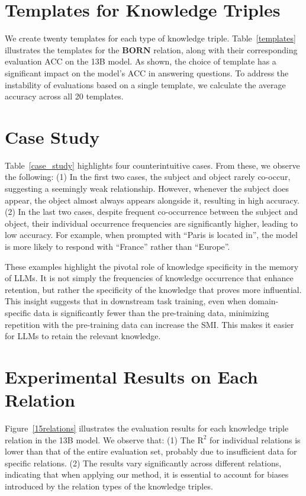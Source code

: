 
\section{Templates for Knowledge Triples}

We create twenty templates for each type of knowledge triple. Table~\ref{templates} illustrates the templates for the \(\mathbf{BORN}\) relation, along with their corresponding evaluation ACC on the 13B model. As shown, the choice of template has a significant impact on the model’s ACC in answering questions. To address the instability of evaluations based on a single template, we calculate the average accuracy across all 20 templates.



\section{Case Study}

Table~\ref{case_study} highlights four counterintuitive cases. From these, we observe the following: (1) In the first two cases, the subject and object rarely co-occur, suggesting a seemingly weak relationship. However, whenever the subject does appear, the object almost always appears alongside it, resulting in high accuracy. (2) In the last two cases, despite frequent co-occurrence between the subject and object, their individual occurrence frequencies are significantly higher, leading to low accuracy. For example, when prompted with ``Paris is located in'', the model is more likely to respond with ``France'' rather than ``Europe''.

These examples highlight the pivotal role of knowledge specificity in the memory of LLMs. It is not simply the frequencies of knowledge occurrence that enhance retention, but rather the specificity of the knowledge that proves more influential. This insight suggests that in downstream task training, even when domain-specific data is significantly fewer than the pre-training data, minimizing repetition with the pre-training data can increase the SMI. This makes it easier for LLMs to retain the relevant knowledge.


\section{Experimental Results on Each Relation}

Figure~\ref{15relations} illustrates the evaluation results for each knowledge triple relation in the 13B model. We observe that: (1) The $\text{R}^2$ for individual relations is lower than that of the entire evaluation set, probably due to insufficient data for specific relations. (2) The results vary significantly across different relations, indicating that when applying our method, it is essential to account for biases introduced by the relation types of the knowledge triples.

